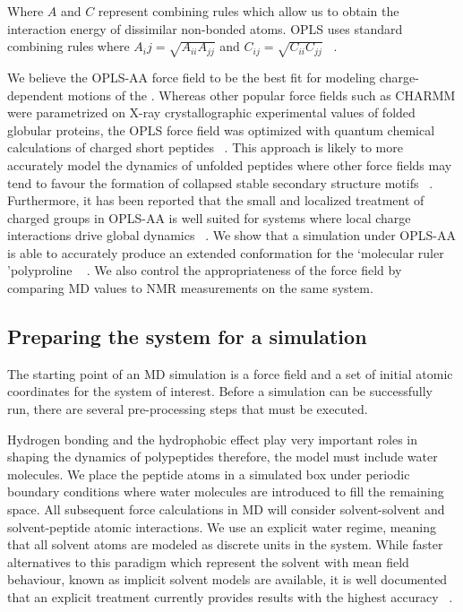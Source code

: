 Where $A$ and $C$ represent combining rules which allow us to obtain the interaction energy of dissimilar non-bonded atoms. OPLS uses standard combining rules where $A_ij = \sqrt{A_{ii}A_{jj}}$ and $C_{ij} = \sqrt{C_{ii}C_{jj}}$ ~\cite{good1970new}.

We believe the OPLS-AA force field to be the best fit for modeling charge-dependent motions of the \gct. Whereas other popular force fields such as CHARMM were parametrized on X-ray crystallographic experimental values of folded globular proteins, the OPLS force field was optimized with quantum chemical calculations of charged short peptides ~\cite{kukol2008molecular}. This approach is likely to more accurately model the dynamics of unfolded peptides where other force fields may tend to favour the formation of collapsed stable secondary structure motifs ~\cite{henriques2015molecular, tran2008role}. Furthermore, it has been reported that the small and localized treatment of charged groups in OPLS-AA is well suited for systems where local charge interactions drive global dynamics ~\cite{vitalis2009absinth}. We show that a simulation under OPLS-AA is able to accurately produce an extended conformation for the \lq molecular ruler \rq polyproline ~\cite{schuler2005polyproline} . We also control the appropriateness of the force field by comparing MD values to NMR measurements on the same system.

\subsection{Preparing the system for a simulation}

The starting point of an MD simulation is a force field and a set of initial atomic coordinates for the system of interest. Before a simulation can be successfully run, there are several pre-processing steps that must be executed. 

Hydrogen bonding and the hydrophobic effect play very important roles in shaping the dynamics of polypeptides therefore, the model must include water molecules. We place the peptide atoms in a simulated box under periodic boundary conditions where water molecules are introduced to fill the remaining space. All subsequent force calculations in MD will consider solvent-solvent and solvent-peptide atomic interactions. We use an explicit water regime, meaning that all solvent atoms are modeled as discrete units in the system. While faster alternatives to this paradigm which represent the solvent with mean field behaviour, known as implicit solvent models are available, it is well documented that an explicit treatment currently provides results with the highest accuracy ~\cite{onufriev2008implicit, arnold1994evaluation, zhou2003free}. 

